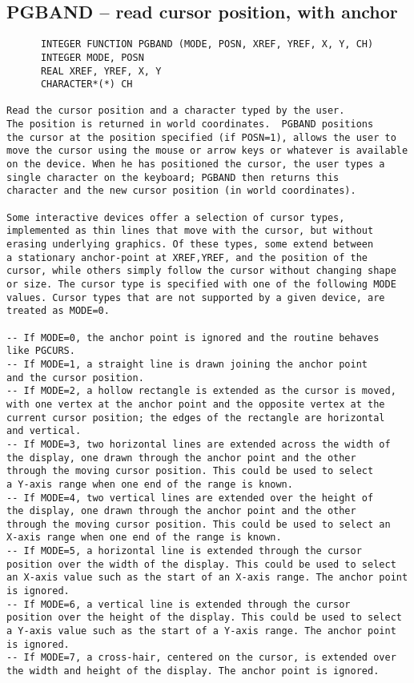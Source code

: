 {\subsection*{PGBAND -- read cursor position, with anchor }
\begin{verbatim}
      INTEGER FUNCTION PGBAND (MODE, POSN, XREF, YREF, X, Y, CH)
      INTEGER MODE, POSN
      REAL XREF, YREF, X, Y
      CHARACTER*(*) CH

Read the cursor position and a character typed by the user.
The position is returned in world coordinates.  PGBAND positions
the cursor at the position specified (if POSN=1), allows the user to
move the cursor using the mouse or arrow keys or whatever is available
on the device. When he has positioned the cursor, the user types a
single character on the keyboard; PGBAND then returns this
character and the new cursor position (in world coordinates).

Some interactive devices offer a selection of cursor types,
implemented as thin lines that move with the cursor, but without
erasing underlying graphics. Of these types, some extend between
a stationary anchor-point at XREF,YREF, and the position of the
cursor, while others simply follow the cursor without changing shape
or size. The cursor type is specified with one of the following MODE
values. Cursor types that are not supported by a given device, are
treated as MODE=0.

-- If MODE=0, the anchor point is ignored and the routine behaves
like PGCURS.
-- If MODE=1, a straight line is drawn joining the anchor point 
and the cursor position.
-- If MODE=2, a hollow rectangle is extended as the cursor is moved,
with one vertex at the anchor point and the opposite vertex at the
current cursor position; the edges of the rectangle are horizontal
and vertical.
-- If MODE=3, two horizontal lines are extended across the width of
the display, one drawn through the anchor point and the other
through the moving cursor position. This could be used to select
a Y-axis range when one end of the range is known.
-- If MODE=4, two vertical lines are extended over the height of
the display, one drawn through the anchor point and the other
through the moving cursor position. This could be used to select an
X-axis range when one end of the range is known.
-- If MODE=5, a horizontal line is extended through the cursor
position over the width of the display. This could be used to select
an X-axis value such as the start of an X-axis range. The anchor point
is ignored.
-- If MODE=6, a vertical line is extended through the cursor
position over the height of the display. This could be used to select
a Y-axis value such as the start of a Y-axis range. The anchor point
is ignored.
-- If MODE=7, a cross-hair, centered on the cursor, is extended over
the width and height of the display. The anchor point is ignored.


\end{verbatim}}
